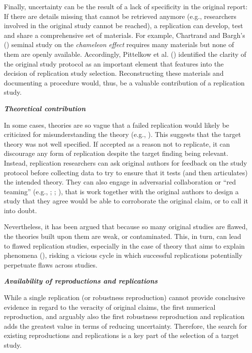 \documentclass[
  letterpaper,
  DIV=11,
  openany,
  fontsize=12pt,
  parskip=half,
  headings=big,
  numbers=noenddot,
  titlepage=false]{scrreprt}
\begin{document}
Finally, uncertainty can be the result of a lack of specificity in the
original report: If there are details missing that cannot be retrieved
anymore (e.g., researchers involved in the original study cannot be
reached), a replication can develop, test and share a comprehensive set
of materials. For example, Chartrand and Bargh's
() seminal study on the
\emph{chameleon effect} requires many materials but none of them are
openly available. Accordingly, Pittelkow et al.
() identified the clarity of the
original study protocol as an important element that features into the
decision of replication study selection. Reconstructing these materials
and documenting a procedure would, thus, be a valuable contribution of a
replication study.

\textbf{\emph{Theoretical contribution}}

In some cases, theories are so vague that a failed replication would
likely be criticized for misunderstanding the theory (e.g.,
). This
suggests that the target theory was not well specified. If accepted as a
reason not to replicate, it can discourage any form of replication
despite the target finding being relevant. Instead, replication
researchers can ask original authors for feedback on the study protocol
before collecting data to try to ensure that it tests (and then
articulates) the intended theory. They can also engage in adversarial
collaboration or ``red teaming'' (e.g.,
;
;
),
that is work together with the original authors to design a study that
they agree would be able to corroborate the original claim, or to call
it into doubt.

Nevertheless, it has been argued that because so many original studies
are flawed, the theories built upon them are weak, or contaminated.
This, in turn, can lead to flawed replication studies, especially in the
case of theory that aims to explain phenomena
(), risking a vicious
cycle in which successful replications potentially perpetuate flaws
across studies.

\textbf{\emph{Availability of reproductions and replications}}

While a single replication (or robustness reproduction) cannot provide
conclusive evidence in regard to the veracity of original claims, the
first numerical reproduction, and arguably also the first robustness
reproduction and replication adds the greatest value in terms of
reducing uncertainty. Therefore, the search for existing reproductions
and replications is a key part of the selection of a target study.
\end{document}
